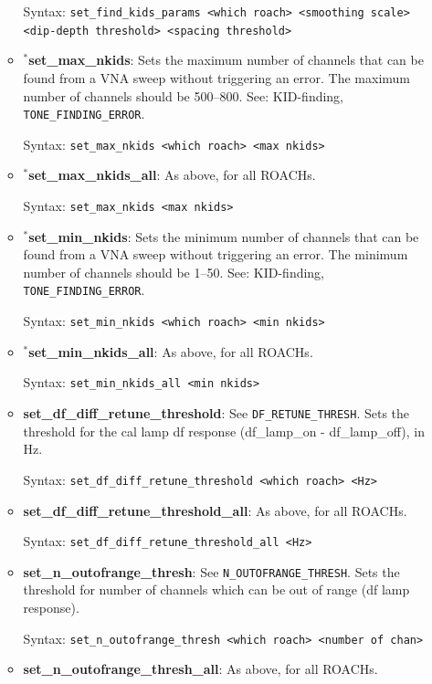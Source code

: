 \begin{itemize}[leftmargin=*,label={}]
\begin{itemize}[leftmargin=*,label={}]
Syntax: \texttt{set\_find\_kids\_params <which roach> <smoothing scale> <dip-depth threshold> <spacing threshold>}

\item $^{*}$\textbf{set\_max\_nkids}: Sets the maximum number of channels that can be found from a VNA sweep without triggering an error. The maximum number of channels should be 500--800. See: KID-finding, \texttt{TONE\_FINDING\_ERROR}.

Syntax: \texttt{set\_max\_nkids <which roach> <max nkids>}

\item $^{*}$\textbf{set\_max\_nkids\_all}: As above, for all ROACHs.

Syntax: \texttt{set\_max\_nkids <max nkids>}

\item $^{*}$\textbf{set\_min\_nkids}: Sets the minimum number of channels that can be found from a VNA sweep without triggering an error. The minimum number of channels should be 1--50. See: KID-finding, \texttt{TONE\_FINDING\_ERROR}.

Syntax: \texttt{set\_min\_nkids <which roach> <min nkids>}

\item $^{*}$\textbf{set\_min\_nkids\_all}: As above, for all ROACHs.

Syntax: \texttt{set\_min\_nkids\_all <min nkids>}

\item \textbf{set\_df\_diff\_retune\_threshold}: See \texttt{DF\_RETUNE\_THRESH}. Sets the threshold for the cal lamp df response (df\_lamp\_on - df\_lamp\_off), in Hz.

Syntax: \texttt{set\_df\_diff\_retune\_threshold <which roach> <Hz>}

\item \textbf{set\_df\_diff\_retune\_threshold\_all}: As above, for all ROACHs.

Syntax: \texttt{set\_df\_diff\_retune\_threshold\_all <Hz>}

\item \textbf{set\_n\_outofrange\_thresh}: See \texttt{N\_OUTOFRANGE\_THRESH}. Sets the threshold for number of channels which can be out of range (df lamp response).

Syntax: \texttt{set\_n\_outofrange\_thresh <which roach> <number of chan>}

\item \textbf{set\_n\_outofrange\_thresh\_all}: As above, for all ROACHs.


\end{itemize}
\end{itemize}
